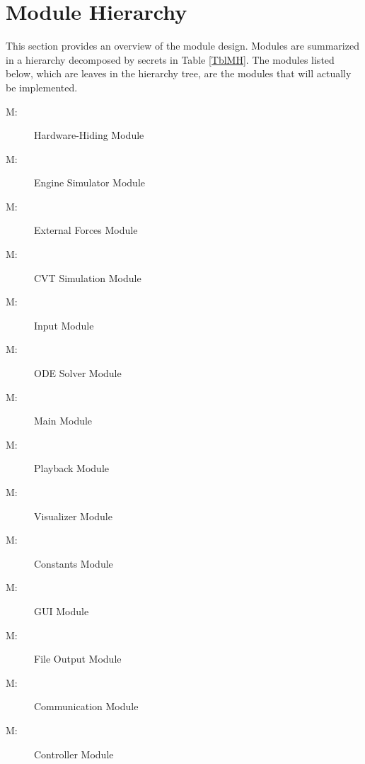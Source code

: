 \documentclass[12pt, titlepage]{article}
\newcounter{mnum}
\newcommand{\mthemnum}{M\themnum}
\begin{document}
\section{Module Hierarchy} \label{SecMH}

This section provides an overview of the module design. Modules are summarized
in a hierarchy decomposed by secrets in Table \ref{TblMH}. The modules listed
below, which are leaves in the hierarchy tree, are the modules that will
actually be implemented.

\begin{description}
  \item [ \mthemnum \label{mHH}:] Hardware-Hiding Module
  \item [ \mthemnum \label{mEngineSim}:] Engine Simulator Module
  \item [ \mthemnum \label{mExternalForces}:] External Forces Module
  \item [ \mthemnum \label{mCVT}:] CVT Simulation Module
  \item [ \mthemnum \label{mInput}:] Input Module
  \item [ \mthemnum \label{mODESolver}:] ODE Solver Module
  \item [ \mthemnum \label{mMain}:] Main Module
  \item [ \mthemnum \label{mPlayback}:] Playback Module
  \item [ \mthemnum \label{mVisualizer}:] Visualizer Module
  \item [ \mthemnum \label{mConstants}:] Constants Module
  \item [ \mthemnum \label{mGUI}:] GUI Module
  \item [ \mthemnum \label{mFileOutput}:] File Output Module
  \item [ \mthemnum \label{mComm}:] Communication Module
  \item [ \mthemnum \label{mController}:] Controller Module
  \end{description}
\end{document}
